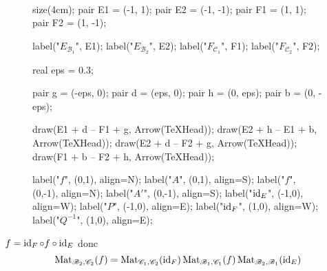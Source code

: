 \begin{prv}~
	\begin{figure}[H]
		\centering
		\begin{asy}
			size(4cm);
			pair E1 = (-1, 1);
			pair E2 = (-1, -1);
			pair F1 = (1, 1);
			pair F2 = (1, -1);

			label("$E_{\mathcal{B}_1}$", E1);
			label("$E_{\mathcal{B}_2}$", E2);
			label("$F_{\mathcal{C}_1}$", F1);
			label("$F_{\mathcal{C}_2}$", F2);

			real eps = 0.3;

			pair g = (-eps, 0);
			pair d = (eps, 0);
			pair h = (0, eps);
			pair b = (0, -eps);

			draw(E1 + d -- F1 + g, Arrow(TeXHead));
			draw(E2 + h -- E1 + b, Arrow(TeXHead));
			draw(E2 + d -- F2 + g, Arrow(TeXHead));
			draw(F1 + b -- F2 + h, Arrow(TeXHead));

			label("\small $f$", (0,1), align=N);
			label("\small $A$", (0,1), align=S);
			label("\small $f$", (0,-1), align=N);
			label("\small $A'$", (0,-1), align=S);
			label("\small $\operatorname{id}_E$", (-1,0), align=W);
			label("\small $P$", (-1,0), align=E);
			label("\small $\operatorname{id}_F$", (1,0), align=W);
			label("\small $Q^{-1}$", (1,0), align=E);
		\end{asy}
	\end{figure}

	$f = \operatorname{id}_F  \circ f \circ \operatorname{id}_E$ donc \[
		\operatorname{Mat}_{\mathcal{B}_2,\mathcal{C}_2}(f) = \operatorname{Mat}_{\mathcal{C}_1,\mathcal{C}_2}(\operatorname{id}_F)
		\operatorname{Mat}_{\mathcal{B}_1,\mathcal{C}_1}(f)
		\operatorname{Mat}_{\mathcal{B}_2,\mathcal{B}_1}(\operatorname{id}_E)
	\]
	\vspace{2cm}
\end{prv}

